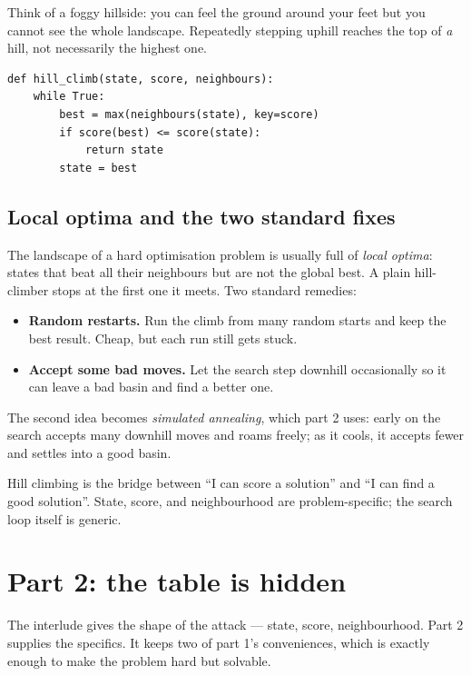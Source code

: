 \documentclass[11pt]{article}
\begin{document}
Think of a foggy hillside: you can feel the ground around your feet but you
cannot see the whole landscape.  Repeatedly stepping uphill reaches the top of
\emph{a} hill, not necessarily the highest one.

\begin{lstlisting}
def hill_climb(state, score, neighbours):
    while True:
        best = max(neighbours(state), key=score)
        if score(best) <= score(state):
            return state
        state = best
\end{lstlisting}

\subsection{Local optima and the two standard fixes}

The landscape of a hard optimisation problem is usually full of
\emph{local optima}: states that beat all their neighbours but are not the
global best.  A plain hill-climber stops at the first one it meets.  Two
standard remedies:

\begin{itemize}
  \item \textbf{Random restarts.}  Run the climb from many random starts and
        keep the best result.  Cheap, but each run still gets stuck.
  \item \textbf{Accept some bad moves.}  Let the search step downhill
        occasionally so it can leave a bad basin and find a better one.
\end{itemize}

The second idea becomes \emph{simulated annealing}, which part 2 uses: early
on the search accepts many downhill moves and roams freely; as it cools, it
accepts fewer and settles into a good basin.

\begin{lesson}
Hill climbing is the bridge between ``I can score a solution'' and ``I can
find a good solution''.  State, score, and neighbourhood are problem-specific;
the search loop itself is generic.
\end{lesson}

\section{Part 2: the table is hidden}\label{sec:part2}

The interlude gives the shape of the attack --- state, score, neighbourhood.
Part 2 supplies the specifics.  It keeps two of part 1's conveniences, which
is exactly enough to make the problem hard but solvable.
\end{document}
